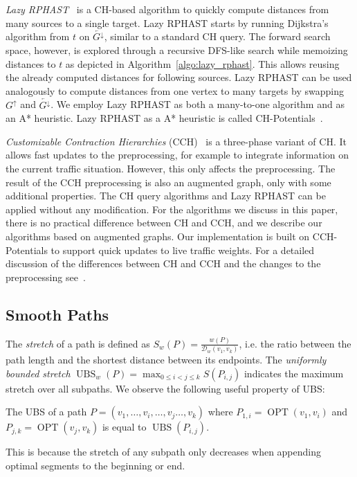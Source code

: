 \documentclass[a4paper,UKenglish,cleveref, autoref, thm-restate]{lipics-v2021}
\newcommand*{\dist}{\mathcal{D}}
\newcommand*{\shp}{\operatorname{OPT}}
\newcommand*{\ubs}{\operatorname{UBS}}
\newcommand*{\gchu}{G^{\uparrow}}
\newcommand*{\gchd}{\overleftarrow{G^{\downarrow}}}
\begin{document}
\emph{Lazy RPHAST}~\cite{strasser_et_al:LIPIcs.SEA.2021.6} is a CH-based algorithm to quickly compute distances from many sources to a single target.
Lazy RPHAST starts by running Dijkstra's algorithm from $t$ on $\gchd$, similar to a standard CH query.
The forward search space, however, is explored through a recursive DFS-like search while memoizing distances to $t$ as depicted in Algorithm~\ref{algo:lazy_rphast}.
This allows reusing the already computed distances for following sources.
Lazy RPHAST can be used analogously to compute distances from one vertex to many targets by swapping $\gchu$ and $\gchd$.
We employ Lazy RPHAST as both a many-to-one algorithm and as an A* heuristic.
Lazy RPHAST as a A* heuristic is called CH-Potentials~\cite{strasser_et_al:LIPIcs.SEA.2021.6}.

\emph{Customizable Contraction Hierarchies} (CCH)~\cite{dsw-cch-15} is a three-phase variant of CH.
It allows fast updates to the preprocessing, for example to integrate information on the current traffic situation.
However, this only affects the preprocessing.
The result of the CCH preprocessing is also an augmented graph, only with some additional properties.
The CH query algorithms and Lazy RPHAST can be applied without any modification.
For the algorithms we discuss in this paper, there is no practical difference between CH and CCH, and we describe our algorithms based on augmented graphs.
Our implementation is built on CCH-Potentials to support quick updates to live traffic weights.
For a detailed discussion of the differences between CH and CCH and the changes to the preprocessing see~\cite{dsw-cch-15}.

\subsection{Smooth Paths}

The \emph{stretch} of a path is defined as $S_w(P) = \frac{w(P)}{\dist_w(v_1, v_k)}$, i.e. the ratio between the path length and the shortest distance between its endpoints.
The \emph{uniformly bounded stretch} $\ubs_w(P) = \max_{0 \leq i < j \leq k}S(P_{i,j})$ indicates the maximum stretch over all subpaths.
We observe the following useful property of UBS:
\begin{observation}\label{obs:append_sp_ubs}
The UBS of a path $P = (v_1, \dots, v_i, \dots, v_j \dots, v_k)$ where $P_{1,i} = \shp(v_1, v_i)$ and $P_{j,k} = \shp(v_j, v_k)$ is equal to $\ubs(P_{i,j})$.
\end{observation}
This is because the stretch of any subpath only decreases when appending optimal segments to the beginning or end.
\end{document}
